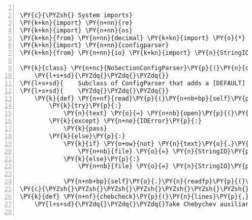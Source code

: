 \begin{Verbatim}[commandchars=\\\{\},fontsize=\small,numbers=left,firstnumber=1,stepnumber=2,firstline=2]

\PY{c}{\PYZsh{} System imports}
\PY{k+kn}{import} \PY{n+nn}{re}
\PY{k+kn}{import} \PY{n+nn}{os}
\PY{k+kn}{from} \PY{n+nn}{decimal} \PY{k+kn}{import} \PY{o}{*}
\PY{k+kn}{import} \PY{n+nn}{configparser}
\PY{k+kn}{from} \PY{n+nn}{io} \PY{k+kn}{import} \PY{n}{StringIO}

\PY{k}{class} \PY{n+nc}{NoSectionConfigParser}\PY{p}{(}\PY{n}{configparser}\PY{o}{.}\PY{n}{ConfigParser}\PY{p}{)}\PY{p}{:}
    \PY{l+s+sd}{\PYZdq{}\PYZdq{}\PYZdq{}}
\PY{l+s+sd}{    Subclass of ConfigParser that adds a [DEFAULT] header if one isn\PYZsq{}t present.}
\PY{l+s+sd}{    \PYZdq{}\PYZdq{}\PYZdq{}}
    \PY{k}{def} \PY{n+nf}{read}\PY{p}{(}\PY{n+nb+bp}{self}\PY{p}{,}\PY{n}{filename}\PY{p}{)}\PY{p}{:}
        \PY{k}{try}\PY{p}{:}
            \PY{n}{text} \PY{o}{=} \PY{n+nb}{open}\PY{p}{(}\PY{n}{filename}\PY{p}{)}\PY{o}{.}\PY{n}{read}\PY{p}{(}\PY{p}{)}
        \PY{k}{except} \PY{n+ne}{IOError}\PY{p}{:}
            \PY{k}{pass}
        \PY{k}{else}\PY{p}{:}
            \PY{k}{if} \PY{o+ow}{not} \PY{n}{text}\PY{o}{.}\PY{n}{startswith}\PY{p}{(}\PY{l+s}{\PYZsq{}}\PY{l+s}{[DEFAULT]}\PY{l+s}{\PYZsq{}}\PY{p}{)}\PY{p}{:}
                \PY{n+nb}{file} \PY{o}{=} \PY{n}{StringIO}\PY{p}{(}\PY{l+s}{\PYZdq{}}\PY{l+s}{[DEFAULT]}\PY{l+s+se}{\PYZbs{}n}\PY{l+s}{\PYZdq{}} \PY{o}{+} \PY{n}{text}\PY{p}{)}
            \PY{k}{else}\PY{p}{:}
                \PY{n+nb}{file} \PY{o}{=} \PY{n}{StringIO}\PY{p}{(}\PY{n}{text}\PY{p}{)}

            \PY{n+nb+bp}{self}\PY{o}{.}\PY{n}{readfp}\PY{p}{(}\PY{n+nb}{file}\PY{p}{,}\PY{n}{filename}\PY{p}{)}
\PY{c}{\PYZsh{}\PYZsh{}\PYZsh{}\PYZsh{}\PYZsh{}\PYZsh{}\PYZsh{}\PYZsh{}\PYZsh{}\PYZsh{}\PYZsh{}\PYZsh{}\PYZsh{}\PYZsh{}\PYZsh{}\PYZsh{}\PYZsh{}\PYZsh{}\PYZsh{}\PYZsh{}\PYZsh{}\PYZsh{}\PYZsh{}\PYZsh{}\PYZsh{}\PYZsh{}\PYZsh{}\PYZsh{}\PYZsh{}\PYZsh{}\PYZsh{}\PYZsh{}\PYZsh{}\PYZsh{}\PYZsh{}\PYZsh{}\PYZsh{}\PYZsh{}\PYZsh{}\PYZsh{}\PYZsh{}\PYZsh{}\PYZsh{}\PYZsh{}\PYZsh{}\PYZsh{}\PYZsh{}\PYZsh{}\PYZsh{}\PYZsh{}\PYZsh{}\PYZsh{}\PYZsh{}\PYZsh{}\PYZsh{}\PYZsh{}\PYZsh{}\PYZsh{}\PYZsh{}\PYZsh{}\PYZsh{}\PYZsh{}\PYZsh{}\PYZsh{}\PYZsh{}\PYZsh{}\PYZsh{}\PYZsh{}\PYZsh{}\PYZsh{}\PYZsh{}\PYZsh{}\PYZsh{}\PYZsh{}\PYZsh{}\PYZsh{}\PYZsh{}\PYZsh{}\PYZsh{}}
\PY{k}{def} \PY{n+nf}{chebcheck}\PY{p}{(}\PY{n}{lines}\PY{p}{,}\PY{n}{rfac}\PY{p}{)}\PY{p}{:}
    \PY{l+s+sd}{\PYZdq{}\PYZdq{}\PYZdq{}Take Chebychev auxiliary lines and return lines with modified a\PYZus{}(1,1)}


\end{Verbatim}
